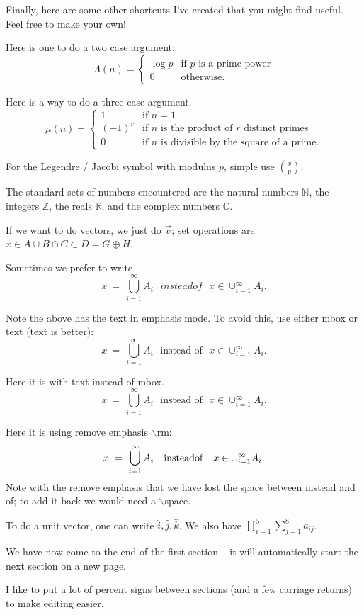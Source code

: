 \documentclass[12pt,reqno]{amsart}
\newcommand\be{\begin{equation}}
\newcommand\ee{\end{equation}}
\newcommand{\twocase}[5]{#1 \begin{cases} #2 & \text{#3}\\ #4
&\text{#5} \end{cases}   }
\newcommand{\threecase}[7]{#1 \begin{cases} #2 &
\text{#3}\\ #4 &\text{#5}\\ #6 &\text{#7} \end{cases}   }
\newcommand{\R}{\ensuremath{\mathbb{R}}}
\newcommand{\C}{\ensuremath{\mathbb{C}}}
\newcommand{\Z}{\ensuremath{\mathbb{Z}}}
\newcommand{\N}{\mathbb{N}}
\newcommand{\js}[1]{ { \underline{#1} \choose p} }
\numberwithin{equation}{section}
\begin{document}
Finally, here are some other shortcuts I've created that you might
find useful. Feel free to make your own!

Here is one to do a two case argument:
\begin{equation}
\twocase{\Lambda(n) = }{\log p}{if $p$ is a prime
power}{0}{otherwise.}
\end{equation}

Here is a way to do a three case argument.
\begin{equation}
\threecase{\mu(n) = }{1}{if $n = 1$}{(-1)^r}{if $n$ is the product
of $r$ distinct primes}{0}{if $n$ is divisible by the square of a
prime.}
\end{equation}

For the Legendre / Jacobi symbol with modulus $p$, simple use
$\js{x}$.

The standard sets of numbers encountered are the natural numbers
$\N$, the integers $\Z$, the reals $\R$, and the complex numbers
$\C$.

If we want to do vectors, we just do $\overrightarrow{v}$; set
operations are $x \in A \cup B \cap C \subset D = G \oplus H$.

Sometimes we prefer to write \be x \ = \ \bigcup_{i=1}^\infty A_i
\ \ \ instead of \ \ \ x \in \cup_{i=1}^\infty A_i. \ee

Note the above has the text in emphasis mode. To avoid this, use
either mbox or text (text is better): \be x \ = \
\bigcup_{i=1}^\infty A_i \ \ \ \mbox{instead of} \ \ \ x \in
\cup_{i=1}^\infty A_i. \ee

Here it is with text instead of mbox. \be x \ = \
\bigcup_{i=1}^\infty A_i \ \ \ \text{instead of} \ \ \ x \in
\cup_{i=1}^\infty A_i. \ee

Here it is using remove emphasis $\backslash$rm: \be x \ = \
\bigcup_{i=1}^\infty A_i \ \ \ {\rm instead of} \ \ \ x \in
\cup_{i=1}^\infty A_i. \ee Note with the remove emphasis that we
have lost the space between instead and of; to add it back we
would need a $\backslash$space.

To do a unit vector, one can write $\widehat{i}, \widehat{j},
\widehat{k}$. We also have $\prod_{i=1}^5 \sum_{j=1}^8 a_{ij}$.

We have now come to the end of the first section -- it will
automatically start the next section on a new page.

I like to put a lot of percent signs between sections (and a few
carriage returns) to make editing easier.


\end{document}
